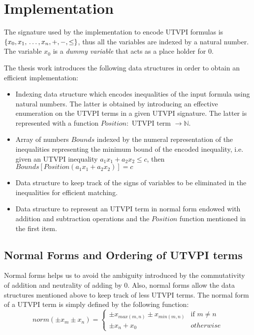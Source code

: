 \section{Implementation}

The signature used by the 
implementation to encode UTVPI formulas
is $\{x_0, x_1, \\ \dots, x_n, +,
-, \leq \}$, thus all the variables are indexed by a natural number. 
The variable $x_0$ is a
\emph{dummy variable} that acts as a place holder for 0. 

The thesis work introduces the following data structures
in order to obtain an efficient implementation:

\begin{itemize}
  \item Indexing data structure
    which encodes inequalities of the input formula 
    using natural numbers. The latter is obtained
    by introducing an effective enumeration on the
    UTVPI terms in a given UTVPI signature. The
    latter is represented with a function
    $Position : \text{ UTVPI term } \rightarrow \mathbb{N}$.
  \item Array of numbers $Bounds$ indexed by the 
    numeral representation of the inequalities 
    representing the minimum bound of 
    the encoded inequality, i.e. given an UTVPI
    inequality $a_1 x_1 + a_2 x_2 \leq c$,
    then $Bounds[Position(a_1 x_1 + a_2 x_2)] = c$
  \item Data structure to keep 
    track of the signs of variables to be eliminated
    in the inequalities for efficient matching.
  \item Data structure to represent an UTVPI
    term in normal form endowed with addition and subtraction 
    operations and the $Position$ function mentioned
    in the first item.
\end{itemize}

\subsection{Normal Forms and Ordering of UTVPI terms}

Normal forms helps us to avoid the ambiguity introduced
by the commutativity of addition and neutrality of adding
by 0.
Also, normal forms allow the data
structures mentioned above to keep track of less UTVPI terms.
The normal form of a UTVPI term is simply defined by the
following function: 
\begin{equation*}
  norm(\pm x_m \pm x_n) = 
  \begin{cases} 
    \pm x_{max(m, n)} \pm x_{min(m, n)} & \text{if } m \neq n \\
    \pm x_{n} + x_0  & otherwise
  \end{cases}
\end{equation*}

